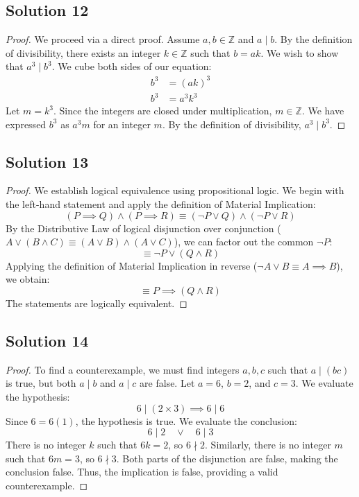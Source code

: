 \documentclass[12pt]{article}
\begin{document}
\subsection*{Solution 12}
\begin{proof}
We proceed via a direct proof. Assume $a, b \in \mathbb{Z}$ and $a \mid b$. By the definition of divisibility, there exists an integer $k \in \mathbb{Z}$ such that $b = ak$. We wish to show that $a^3 \mid b^3$. We cube both sides of our equation:
\begin{align*}
    b^3 &= (ak)^3 \\
    b^3 &= a^3 k^3
\end{align*}
Let $m = k^3$. Since the integers are closed under multiplication, $m \in \mathbb{Z}$. We have expressed $b^3$ as $a^3 m$ for an integer $m$. By the definition of divisibility, $a^3 \mid b^3$.
\end{proof}

\subsection*{Solution 13}
\begin{proof}
We establish logical equivalence using propositional logic. We begin with the left-hand statement and apply the definition of Material Implication:
\[ (P \implies Q) \land (P \implies R) \equiv (\neg P \lor Q) \land (\neg P \lor R) \]
By the Distributive Law of logical disjunction over conjunction ($A \lor (B \land C) \equiv (A \lor B) \land (A \lor C)$), we can factor out the common $\neg P$:
\[ \equiv \neg P \lor (Q \land R) \]
Applying the definition of Material Implication in reverse ($\neg A \lor B \equiv A \implies B$), we obtain:
\[ \equiv P \implies (Q \land R) \]
The statements are logically equivalent.
\end{proof}

\subsection*{Solution 14}
\begin{proof}
To find a counterexample, we must find integers $a, b, c$ such that $a \mid (bc)$ is true, but both $a \mid b$ and $a \mid c$ are false. 
Let $a = 6$, $b = 2$, and $c = 3$. 
We evaluate the hypothesis:
\[ 6 \mid (2 \times 3) \implies 6 \mid 6 \]
Since $6 = 6(1)$, the hypothesis is true. 
We evaluate the conclusion:
\[ 6 \mid 2 \quad \lor \quad 6 \mid 3 \]
There is no integer $k$ such that $6k = 2$, so $6 \nmid 2$. Similarly, there is no integer $m$ such that $6m = 3$, so $6 \nmid 3$. Both parts of the disjunction are false, making the conclusion false. Thus, the implication is false, providing a valid counterexample.
\end{proof}
\end{document}
